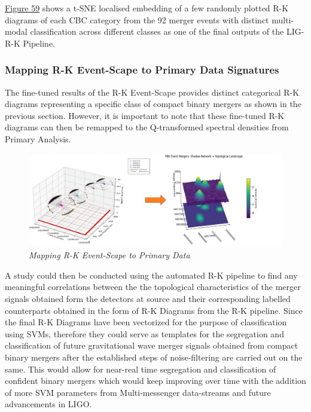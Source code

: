\hyperref[fig:ligo_tsne]{Figure 59} shows a t-SNE localised embedding of a few randomly plotted R-K diagrams of each CBC category from the 92 merger events with distinct multi-modal classification across different classes as one of the final outputs of the LIG-R-K Pipeline.


\subsubsection{ Mapping R-K Event-Scape to Primary Data Signatures}
 
 The fine-tuned results of the R-K Event-Scape provides distinct categorical R-K diagrams representing a specific class of compact binary mergers as shown in the previous section. However, it is important to note that these fine-tuned R-K diagrams can then be remapped to the Q-transformed spectral densities from Primary Analysis.  
 
 \begin{figure}[H]
 	\centering
 	\includegraphics[width=1.0\linewidth]{images/76_Mapping R_K eventScape to Primary Data.jpg}
	\caption{\textit{Mapping R-K Event-Scape to Primary Data}}
 	\label{fig:LIGO17_PlaceHolder_fig}
 \end{figure}

A study could then be conducted using the automated R-K pipeline to find any meaningful correlations between the the topological characteristics of the merger signals obtained form the detectors at source and their corresponding labelled counterparts obtained in the form of R-K Diagrams from the R-K pipeline. Since the final R-K Diagrams have been vectorized for the purpose of classification using SVMs, therefore they could serve as templates for the segregation and classification of future gravitational wave merger signals  obtained from compact binary mergers after the established steps of noise-filtering are carried out on the same. This would allow for near-real time segregation and classification of confident binary mergers which would keep improving over time with the addition of more SVM parameters from Multi-messenger data-streams and future advancements in LIGO. 

